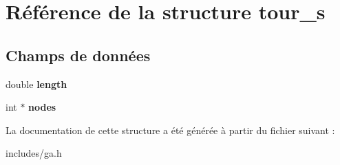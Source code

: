 \hypertarget{structtour__s}{}\section{Référence de la structure tour\+\_\+s}
\label{structtour__s}
\subsection*{Champs de données}
\begin{DoxyCompactItemize}
\item 
\mbox{\label{structtour__s_a081be2269828ba943a1f30cab95e5132}} 
double {\bfseries length}
\item 
\mbox{\label{structtour__s_a79dff520e3a8b78353790780243042dc}} 
int $\ast$ {\bfseries nodes}
\end{DoxyCompactItemize}


La documentation de cette structure a été générée à partir du fichier suivant \+:\begin{DoxyCompactItemize}
\item 
includes/ga.\+h\end{DoxyCompactItemize}
